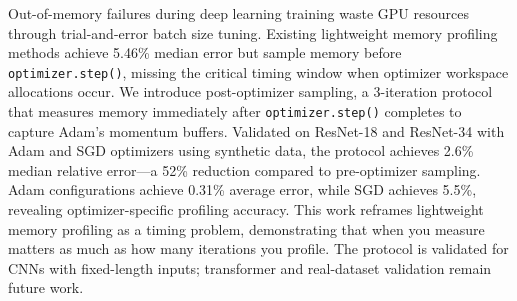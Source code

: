 
Out-of-memory failures during deep learning training waste GPU resources through trial-and-error batch size tuning. Existing lightweight memory profiling methods achieve 5.46\% median error but sample memory before \texttt{optimizer.step()}, missing the critical timing window when optimizer workspace allocations occur. We introduce post-optimizer sampling, a 3-iteration protocol that measures memory immediately after \texttt{optimizer.step()} completes to capture Adam's momentum buffers. Validated on ResNet-18 and ResNet-34 with Adam and SGD optimizers using synthetic data, the protocol achieves 2.6\% median relative error---a 52\% reduction compared to pre-optimizer sampling. Adam configurations achieve 0.31\% average error, while SGD achieves 5.5\%, revealing optimizer-specific profiling accuracy. This work reframes lightweight memory profiling as a timing problem, demonstrating that when you measure matters as much as how many iterations you profile. The protocol is validated for CNNs with fixed-length inputs; transformer and real-dataset validation remain future work.

